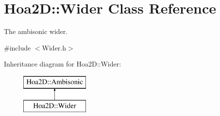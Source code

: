 \hypertarget{class_hoa2_d_1_1_wider}{\section{Hoa2\-D\-:\-:Wider Class Reference}
\label{class_hoa2_d_1_1_wider}
}


The ambisonic wider.  




{\ttfamily \#include $<$Wider.\-h$>$}

Inheritance diagram for Hoa2\-D\-:\-:Wider\-:\begin{figure}[H]
\begin{center}
\leavevmode
\includegraphics[height=2.000000cm]{class_hoa2_d_1_1_wider}
\end{center}
\end{figure}
